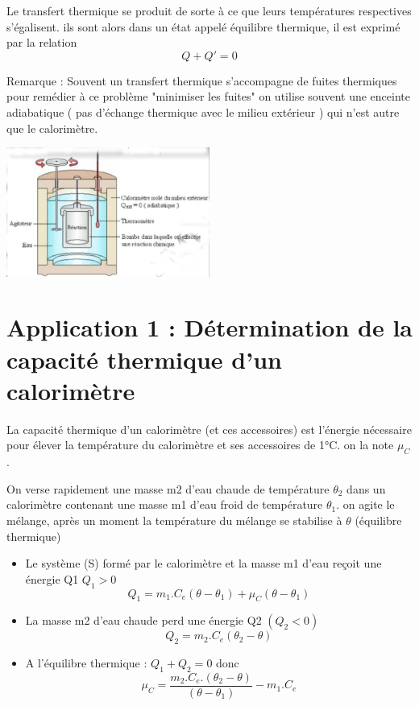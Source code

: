 \documentclass[12pt]{article}
\begin{document}
Le transfert thermique se produit de sorte à ce que leurs températures respectives
s’égalisent. ils sont alors dans un état appelé équilibre thermique, il est exprimé par la
relation
$$Q + Q' = 0$$

Remarque :
Souvent un transfert thermique s'accompagne
de fuites thermiques pour remédier à ce problème
"minimiser les fuites" on utilise souvent une
enceinte adiabatique ( pas d'échange thermique
avec le milieu extérieur ) qui n'est autre que le
calorimètre.
\begin{center}

   \includegraphics[width=0.5\textwidth]{./img/img02.jpg}
\end{center}

\section{Application 1 : Détermination de la capacité thermique d'un calorimètre }

La capacité thermique d'un calorimètre (et ces
accessoires) est l'énergie nécessaire pour élever la
température du calorimètre et ses accessoires de 1°C. on
la note $\mu_C$. 

On verse rapidement une masse m2 d'eau chaude de
température $\theta_2$ dans un calorimètre contenant une masse
m1 d'eau froid de température $\theta_1$. on agite le mélange,
après un moment la température du mélange se stabilise à
$\theta$ (équilibre thermique)

\begin{itemize}
    \item Le système (S) formé par le calorimètre et la masse m1 d'eau
reçoit une énergie Q1 $Q_1 > 0$
        $$Q_1 = m_1.C_e(\theta - \theta_1) + \mu_C(\theta - \theta_1)$$
    \item La masse m2 d'eau chaude perd une énergie Q2 $(Q_2 < 0)$
        $$Q_2 = m_2.C_e(\theta_2 - \theta) $$
    \item A l'équilibre thermique : $Q_1 + Q_2 = 0$  donc $$\mu_C = \frac{m_2.C_e.(\theta_2 - \theta)}{(\theta - \theta_1)} - m_1.C_e$$
\end{itemize}
\end{document}
